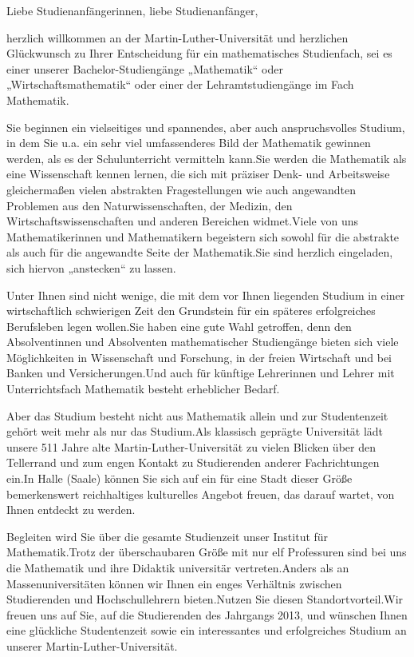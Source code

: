 Liebe Studienanfängerinnen, liebe Studienanfänger,

herzlich willkommen an der Martin-Luther-Universität und herzlichen Glückwunsch zu Ihrer Entscheidung für ein mathematisches Studienfach, sei es einer unserer Bachelor-Studiengänge „Mathematik“ oder „Wirtschaftsmathematik“ oder einer der Lehramtstudiengänge im Fach Mathematik.

Sie beginnen ein vielseitiges und spannendes, aber auch anspruchsvolles Studium, in dem Sie u.a. ein sehr viel umfassenderes Bild der Mathematik gewinnen werden, als es der Schulunterricht vermitteln kann.Sie werden die Mathematik als eine Wissenschaft kennen lernen, die sich mit präziser Denk- und Arbeitsweise gleichermaßen vielen abstrakten Fragestellungen wie auch angewandten Problemen aus den Naturwissenschaften, der Medizin, den Wirtschaftswissenschaften und anderen Bereichen widmet.Viele von uns Mathematikerinnen und Mathematikern begeistern sich sowohl für die abstrakte als auch für die angewandte Seite der Mathematik.Sie sind herzlich eingeladen, sich hiervon „anstecken“ zu lassen.

Unter Ihnen sind nicht wenige, die mit dem vor Ihnen liegenden Studium in einer wirtschaftlich schwierigen Zeit den Grundstein für ein späteres erfolgreiches Berufsleben legen wollen.Sie haben eine gute Wahl getroffen, denn den Absolventinnen und Absolventen mathematischer Studiengänge bieten sich viele Möglichkeiten in Wissenschaft und Forschung, in der freien Wirtschaft und bei Banken und Versicherungen.Und auch für künftige Lehrerinnen und Lehrer mit Unterrichtsfach Mathematik besteht erheblicher Bedarf.

Aber das Studium besteht nicht aus Mathematik allein und zur Studentenzeit gehört weit mehr als nur das Studium.Als klassisch geprägte Universität lädt unsere 511 Jahre alte Martin-Luther-Universität zu vielen Blicken über den Tellerrand und zum engen Kontakt zu Studierenden anderer Fachrichtungen ein.In Halle (Saale) können Sie sich auf ein für eine Stadt dieser Größe bemerkenswert reichhaltiges kulturelles Angebot freuen, das darauf wartet, von Ihnen entdeckt zu werden.

Begleiten wird Sie über die gesamte Studienzeit unser Institut für Mathematik.Trotz der überschaubaren Größe mit nur elf Professuren sind bei uns die Mathematik und ihre Didaktik universitär vertreten.Anders als an Massenuniversitäten können wir Ihnen ein enges Verhältnis zwischen Studierenden und Hochschullehrern bieten.Nutzen Sie diesen Standortvorteil.Wir freuen uns auf Sie, auf die Studierenden des Jahrgangs 2013, und wünschen Ihnen eine glückliche Studentenzeit sowie ein interessantes und erfolgreiches Studium an unserer Martin-Luther-Universität.

